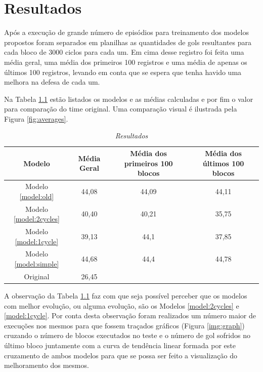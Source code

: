 \chapter{Resultados} \label{sec:results}

Após a execução de grande número de episódios para treinamento dos modelos
propostos foram separados em planilhas as quantidades de gols resultantes para
cada bloco de 3000 ciclos para cada um. Em cima desse registro foi feita uma
média geral, uma média dos primeiros 100 registros e uma média de apenas os
últimos 100 registros, levando em conta que se
espera que tenha havido uma melhora na defesa de cada um.

Na Tabela \ref{tab:results} estão listados os modelos e as médias calculadas e
por fim o valor para comparação do time original. Uma comparação visual é
ilustrada pela Figura \ref{fig:averages}.

\begin{table}[hbt]
    \centering
    \begin{tabular}{c|c|c|c}
        Modelo & Média Geral & Média dos primeiros 100 blocos & Média dos últimos 100 blocos \\ \hline
        Modelo \ref{model:old} & 44,08 & 44,09 & 44,11  \\
        Modelo \ref{model:2cycles} & 40,40 & 40,21 & 35,75 \\
        Modelo \ref{model:1cycle} & 39,13 & 44,1 & 37,85 \\
        Modelo \ref{model:simple} & 44,68 & 44,4 & 44,78 \\ \hline
        Original &  26,45\\
    \end{tabular}
    \caption{\textit{Resultados}}
    \label{tab:results}
\end{table}


A observação da Tabela \ref{tab:results} faz com que seja possível perceber que
os modelos com melhor evolução, ou alguma evolução, são os Modelos
\ref{model:2cycles} e \ref{model:1cycle}. Por conta desta observação foram
realizados um número maior de execuções nos mesmos para que fossem 
traçados gráficos (Figura \ref{img:graph}) cruzando o número de blocos executados no teste e o número de
gol sofridos no último bloco juntamente com a curva de tendência linear formada
por este cruzamento de ambos modelos para que se possa ser feito a visualização
do melhoramento dos mesmos.

